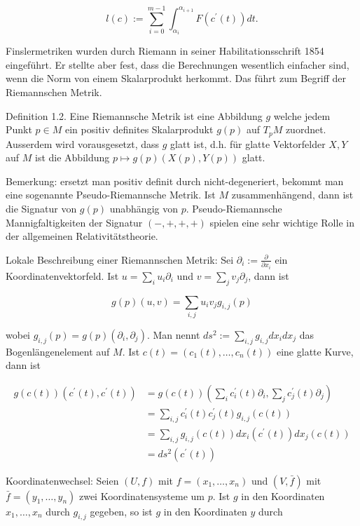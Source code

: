 \documentclass[10pt]{article}
\begin{document}
$$
l(c):=\sum_{i=0}^{m-1} \int_{\alpha_{i}}^{\alpha_{i+1}} F\left(c^{\prime}(t)\right) d t .
$$

Finslermetriken wurden durch Riemann in seiner Habilitationsschrift 1854 eingeführt. Er stellte aber fest, dass die Berechnungen wesentlich einfacher sind, wenn die Norm von einem Skalarprodukt herkommt. Das führt zum Begriff der Riemannschen Metrik.

Definition 1.2. Eine Riemannsche Metrik ist eine Abbildung $g$ welche jedem Punkt $p \in M$ ein positiv definites Skalarprodukt $g(p)$ auf $T_{p} M$ zuordnet. Ausserdem wird vorausgesetzt, dass $g$ glatt ist, d.h. für glatte Vektorfelder $X, Y$ auf $M$ ist die Abbildung $p \mapsto g(p)(X(p), Y(p))$ glatt.

Bemerkung: ersetzt man positiv definit durch nicht-degeneriert, bekommt man eine sogenannte Pseudo-Riemannsche Metrik. Ist $M$ zusammenhängend, dann ist die Signatur von $g(p)$ unabhängig von $p$. Pseudo-Riemannsche Mannigfaltigkeiten der Signatur $(-,+,+,+)$ spielen eine sehr wichtige Rolle in der allgemeinen Relativitätstheorie.

Lokale Beschreibung einer Riemannschen Metrik: Sei $\partial_{i}:=\frac{\partial}{\partial x_{i}}$ ein Koordinatenvektorfeld. Ist $u=\sum_{i} u_{i} \partial_{i}$ und $v=\sum_{j} v_{j} \partial_{j}$, dann ist

$$
g(p)(u, v)=\sum_{i, j} u_{i} v_{j} g_{i, j}(p)
$$

wobei $g_{i, j}(p)=g(p)\left(\partial_{i}, \partial_{j}\right)$. Man nennt $d s^{2}:=\sum_{i, j} g_{i, j} d x_{i} d x_{j}$ das Bogenlängenelement auf $M$. Ist $c(t)=\left(c_{1}(t), \ldots, c_{n}(t)\right)$ eine glatte Kurve, dann ist

$$
\begin{aligned}
g(c(t))\left(c^{\prime}(t), c^{\prime}(t)\right) & =g(c(t))\left(\sum_{i} c_{i}^{\prime}(t) \partial_{i}, \sum_{j} c_{j}^{\prime}(t) \partial_{j}\right) \\
& =\sum_{i, j} c_{i}^{\prime}(t) c_{j}^{\prime}(t) g_{i, j}(c(t)) \\
& =\sum_{i, j} g_{i, j}(c(t)) d x_{i}\left(c^{\prime}(t)\right) d x_{j}(c(t)) \\
& =d s^{2}\left(c^{\prime}(t)\right)
\end{aligned}
$$

Koordinatenwechsel: Seien $(U, f)$ mit $f=\left(x_{1}, \ldots, x_{n}\right)$ und $(V, \bar{f})$ mit $\bar{f}=\left(y_{1}, \ldots, y_{n}\right)$ zwei Koordinatensysteme um $p$. Ist $g$ in den Koordinaten $x_{1}, \ldots, x_{n}$ durch $g_{i, j}$ gegeben, so ist $g$ in den Koordinaten $y$ durch
\end{document}

